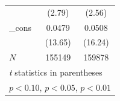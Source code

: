 \documentclass[a4paper,11pt]{article}
\begin{document}
\begin{table}[htbp]
\begin{tabular}{l*{2}{c}}
            &      (2.79)         &      (2.56)         \\
[1em]
\_cons      &      0.0479\sym{***}&      0.0508\sym{***}\\
            &     (13.65)         &     (16.24)         \\
\hline
\(N\)       &      155149         &      159878         \\
\hline\hline
\multicolumn{3}{l}{\footnotesize \textit{t} statistics in parentheses}\\
\multicolumn{3}{l}{\footnotesize \sym{*} \(p<0.10\), \sym{**} \(p<0.05\), \sym{***} \(p<0.01\)}\\
\end{tabular}
\end{table}

\end{document}
